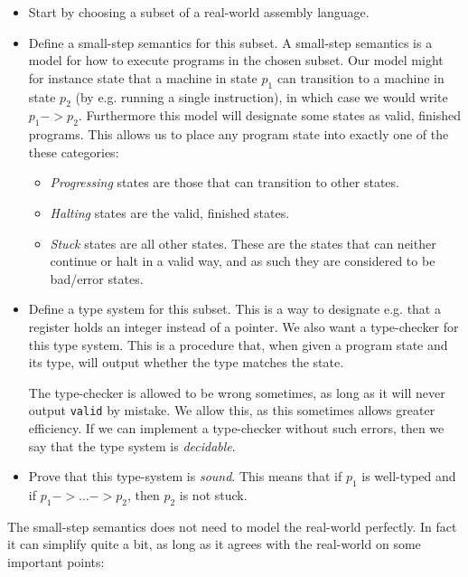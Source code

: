 \begin{itemize}
\item Start by choosing a subset of a real-world assembly language.

\item Define a small-step semantics for this subset. A small-step semantics is a
  model for how to execute programs in the chosen subset. Our model might for
  instance state that a machine in state $p_1$ can transition to a machine in
  state $p_2$ (by e.g. running a single instruction), in which case we would
  write $p_1 -> p_2$. Furthermore this model will designate some states as
  valid, finished programs. This allows us to place any program state into
  exactly one of the these categories:

  \begin{itemize}
  \item \emph{Progressing} states are those that can transition to other states.
  \item \emph{Halting} states are the valid, finished states.
  \item \emph{Stuck} states are all other states. These are the states that can
    neither continue or halt in a valid way, and as such they are considered to
    be bad/error states.
  \end{itemize}

\item Define a type system for this subset. This is a way to designate e.g. that
  a register holds an integer instead of a pointer. We also want a type-checker
  for this type system. This is a procedure that, when given a program state and
  its type, will output whether the type matches the state.

  The type-checker is allowed to be wrong sometimes, as long as it will never
  output \texttt{valid} by mistake. We allow this, as this sometimes allows
  greater efficiency. If we can implement a type-checker without such errors,
  then we say that the type system is \emph{decidable}.

\item Prove that this type-system is \emph{sound}. This means that if $p_1$ is
  well-typed and if $p_1 -> \dots -> p_2$, then $p_2$ is not stuck.
\end{itemize}

The small-step semantics does not need to model the real-world perfectly. In
fact it can simplify quite a bit, as long as it agrees with the real-world
on some important points:

